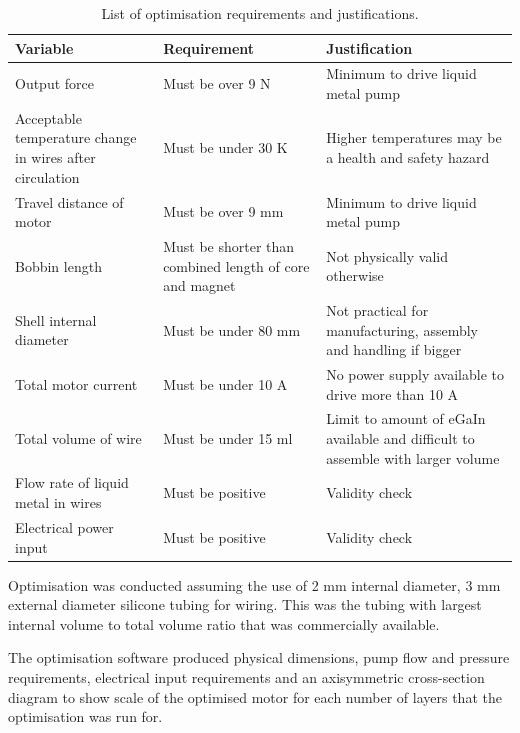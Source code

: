 \documentclass[a4paper,12pt]{article}
\begin{document}
\begin{table} [h!] 
	\centering
	\caption{List of optimisation requirements and justifications.}
	\label{tb:optrequirements}
	\begin{tabular}{M | M | M} 
		\textbf{Variable} & \textbf{Requirement} & \textbf{Justification} \\ [0.5ex] 
		\hline\hline
		Output force & Must be over 9 N & Minimum to drive liquid metal pump \\
		\hline
		Acceptable temperature change in wires after circulation & Must be under 30 K & Higher temperatures may be a health and safety hazard \\
		\hline
		Travel distance of motor & Must be over 9 mm & Minimum to drive liquid metal pump \\ 
		\hline
		Bobbin length & Must be shorter than combined length of core and magnet & Not physically valid otherwise \\ 
		\hline
		Shell internal diameter & Must be under 80 mm & Not practical for manufacturing, assembly and handling if bigger \\ 
		\hline
		Total motor current & Must be under 10 A & No power supply available to drive more than 10 A \\ 
		\hline
		Total volume of wire & Must be under 15 ml & Limit to amount of eGaIn available and difficult to assemble with larger volume \\ 
		\hline
		Flow rate of liquid metal in wires & Must be positive & Validity check \\ 
		\hline
		Electrical power input & Must be positive & Validity check \\ 
		\hline
	\end{tabular}
\end{table}

Optimisation was conducted assuming the use of 2 mm internal diameter, 3 mm external diameter silicone tubing for wiring. This was the tubing with largest internal volume to total volume ratio that was commercially available.

The optimisation software produced physical dimensions, pump flow and pressure requirements, electrical input requirements and an axisymmetric cross-section diagram to show scale of the optimised motor for each number of layers that the optimisation was run for.
\end{document}
